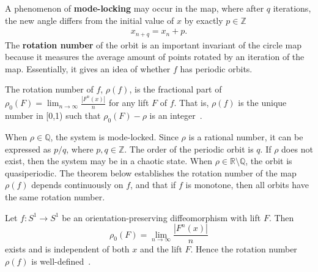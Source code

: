 A phenomenon of \textbf{mode-locking} may occur in the map,
where after $q$ iterations, the new angle differs from the initial
value of $x$ by exactly $p \in \mathbb{Z}$
\begin{align*}
x_{n+q}=x_n+p.
\end{align*}
The \textbf{rotation number} of the orbit is an important invariant of
the circle map because it measures the average amount of points
rotated by an iteration of the map. Essentially, it gives an idea of
whether $f$ has periodic orbits.

\begin{singlespacing}
\begin{definition}\label{rho}
The rotation number of $f$, $\rho(f)$, is the fractional part of
$\rho_0(F) = \lim_{n \to \infty} \frac{|F^n(x)|}{n}$ for any lift $F$ of $f$. That is, $\rho(f)$ is the unique
number in [0,1) such that $\rho_0(F)-\rho$ is an integer~\cite{devaney}.
\end{definition}
\end{singlespacing}

\noindent When $\rho \in \mathbb{Q}$, the system is mode-locked. Since
$\rho$ is a rational number, it can be expressed as $p/q$, where $p,q
\in \mathbb{Z}$. The order of the periodic orbit is $q$. If $\rho$
does not exist, then the system may be in a chaotic
state. When $\rho \in \mathbb{R} \setminus \mathbb{Q}$, the orbit is
quasiperiodic. The theorem below
establishes the rotation number of the map $\rho(f)$
depends continuously on $f$, and that if $f$ is monotone, then all
orbits have the same rotation number.

\begin{singlespacing}
\begin{theorem}
Let $f:S^1 \to S^1$ be an orientation-preserving diffeomorphism with
lift $F$. Then
\begin{equation*}
\rho_0(F) = \lim_{n \to \infty} \frac{|F^n(x)|}{n}
\end{equation*}
exists and is independent of both $x$ and the lift $F$. Hence the
rotation number $\rho(f)$ is well-defined~\cite{devaney}.
\end{theorem}
\end{singlespacing}

